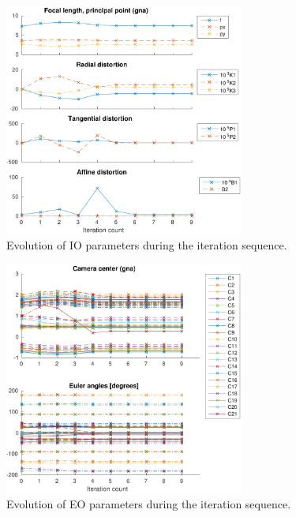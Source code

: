 \documentclass{article}
\begin{document}
\begin{figure}
  \centering
  \includegraphics[width=0.7\textwidth]{ill/ccamiotrace}
  \caption{Evolution of IO parameters during the iteration sequence.}
  \label{fig:IOtrace}
\end{figure}

\begin{figure}
  \centering
  \includegraphics[width=0.7\textwidth]{ill/ccameotrace}
  \caption{Evolution of EO parameters during the iteration sequence.}
  \label{fig:EOtrace}
\end{figure}
\end{document}
